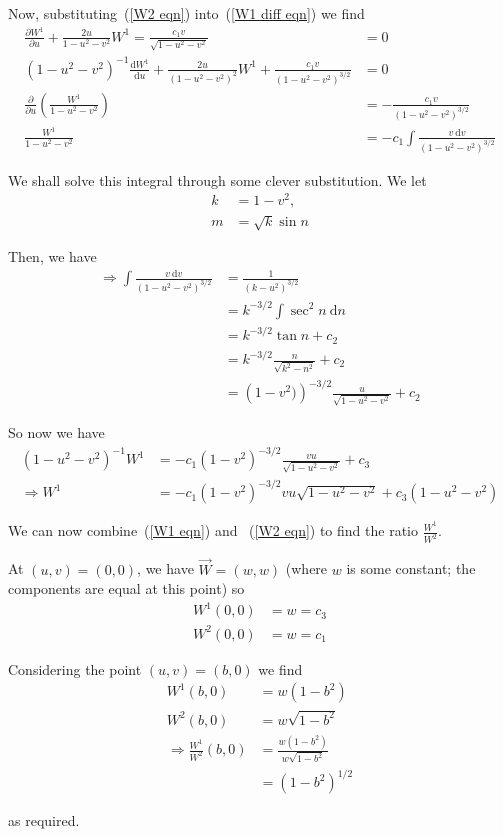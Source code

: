 \documentclass[a4paper]{article} %
\begin{document}
Now, substituting~(\ref{W2 eqn}) into~(\ref{W1 diff eqn}) we find
\begin{align}
\frac{\partial W^{1}}{\partial u}+\frac{2u}{1-u^2-v^2}W^1=\frac{c_1 v	}{\sqrt{1-u^2-v^2}}&=0\\
(1-u^2-v^2)^{-1}\frac{\text{d}W^{1}}{\text{d}u}+\frac{2u}{(1-u^2-v^2)^2} W^{1}
+\frac{c_1 v}{(1-u^2-v^2)^{3/2}}&=0\\
\frac{\partial}{\partial u}\left(\frac{W^{1}}{1-u^2-v^2}\right)&=-\frac{c_1 v}{(1-u^2-v^2)^{3/2}}\\
\frac{W^1}{1-u^2-v^2}&=-c_1\int \frac{v~\text{d}v}{(1-u^2-v^2)^{3/2}}
\end{align}

We shall solve this integral through some clever substitution. We let
\begin{align}
k&=1-v^2,\\
m&=\sqrt{k}\sin n
\end{align}

Then, we have
\begin{align}
\Rightarrow \int\frac{v~\text{d}v}{(1-u^2-v^2)^{3/2}}&=\frac{1}{(k-u^2)^{3/2}}\\
&=k^{-3/2}\int \sec^2 n ~ \text{d}n\\
&=k^{-3/2}\tan n + c_2\\
&=k^{-3/2}\frac{n}{\sqrt{k^2-n^2}}+c_2\\
&=\left(1-v^2)\right)^{-3/2}\frac{u}{\sqrt{1-u^2-v^2}}+c_2
\end{align}

So now we have
\begin{align}
\left(1-u^2-v^2\right)^{-1}W^{1}&=-c_1\left(1-v^2\right)^{-3/2}\frac{vu}{\sqrt{1-u^2-v^2}}+c_3\\
\Rightarrow W^{1}&=-c_1 \left(1-v^2\right)^{-3/2}vu\sqrt{1-u^2-v^2}+c_3\left(1-u^2-v^2\right)
\label{W1 eqn}
\end{align}

We can now combine~(\ref{W1 eqn}) and ~(\ref{W2 eqn}) to find the ratio $\frac{W^1}{W^2}$.

At $(u,v)=(0,0)$, we have $\vec{W}=(w,w)$ (where $w$ is some constant; the components are equal at this point) so
\begin{align}
W^1(0,0)&=w=c_3\\
W^2(0,0)&=w=c_1
\end{align}

Considering the point $(u,v)=(b,0)$ we find
\begin{align}
W^1(b,0)&=w(1-b^2)\\
W^2(b,0)&=w\sqrt{1-b^2}\\
\Rightarrow \frac{W^1}{W^2}(b,0)&=\frac{w(1-b^2)}{w\sqrt{1-b^2}}\\
&=\left(1-b^2\right)^{1/2}
\end{align}

as required.
\end{document}
